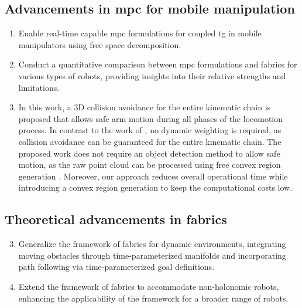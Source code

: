 \subsection{Advancements in \ac{mpc} for mobile manipulation}
\begin{enumerate}
    \item Enable real-time capable \ac{mpc} formulations for
      coupled \ac{tg} in mobile manipulators
      using free space decomposition.
    \item Conduct a quantitative comparison between \ac{mpc}
      formulations and \ac{fabrics} for various types of
      robots, providing insights into their relative
      strengths and limitations.
    \item In this work, a 3D collision avoidance for the
      entire kinematic chain is proposed that allows safe
      arm motion during all phases of the locomotion
      process. In contrast to the work of
      \cite{Avanzini2018}, no dynamic weighting is required,
      as collision avoidance can be guaranteed for the
      entire kinematic chain. The proposed work does not
      require an object detection method to allow safe
      motion, as the raw point cloud can be processed using
      free convex region generation \cite{Liu2017}.
      Moreover, our approach reduces overall operational
      time while introducing a convex region generation to
      keep the computational costs low. 
\end{enumerate}

\subsection{Theoretical advancements in \ac{fabrics}}
\begin{enumerate}
    \setcounter{enumi}{2}
    \item Generalize the framework of \ac{fabrics}
      for dynamic environments, integrating moving obstacles
      through time-parameterized manifolds and incorporating
      path following via time-parameterized goal
      definitions.
    \item Extend the framework of \ac{fabrics} to
      accommodate non-holonomic robots, enhancing the
      applicability of the framework for a broader range of
      robots.
\end{enumerate}

